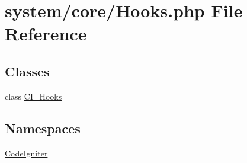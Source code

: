 \hypertarget{_hooks_8php}{}\section{system/core/\+Hooks.php File Reference}
\label{_hooks_8php}
\subsection*{Classes}
\begin{DoxyCompactItemize}
\item 
class \mbox{\hyperlink{class_c_i___hooks}{C\+I\+\_\+\+Hooks}}
\end{DoxyCompactItemize}
\subsection*{Namespaces}
\begin{DoxyCompactItemize}
\item 
 \mbox{\hyperlink{namespace_code_igniter}{Code\+Igniter}}
\end{DoxyCompactItemize}
